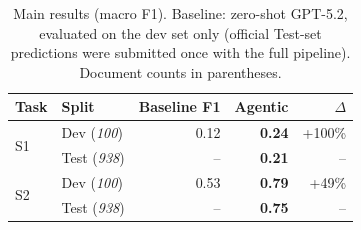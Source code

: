 \documentclass[11pt]{article}
\begin{document}
\begin{table}[t!]
	\centering
	\small
	\setlength{\tabcolsep}{4pt}
	\begin{tabular}{@{}l l r r r@{}}
		\toprule
		\textbf{Task} & \textbf{Split}      & \textbf{Baseline F1} & \textbf{Agentic} & \textbf{$\Delta$} \\
		\midrule
		\multirow{2}{*}{S1}
		              & Dev (\textit{100})  & 0.12                 & \textbf{0.24}    & +100\%            \\
		              & Test (\textit{938}) & --                   & \textbf{0.21}    & --                \\
		\midrule
		\multirow{2}{*}{S2}
		              & Dev (\textit{100})  & 0.53                 & \textbf{0.79}    & +49\%             \\
		              & Test (\textit{938}) & --                   & \textbf{0.75}    & --                \\
		\bottomrule
	\end{tabular}
	\caption{Main results (macro F1). Baseline: zero-shot GPT-5.2, evaluated on the dev set only (official Test-set predictions were submitted once with the full pipeline). Document counts in parentheses.}

	\label{tab:main_results}
\end{table}
\end{document}
